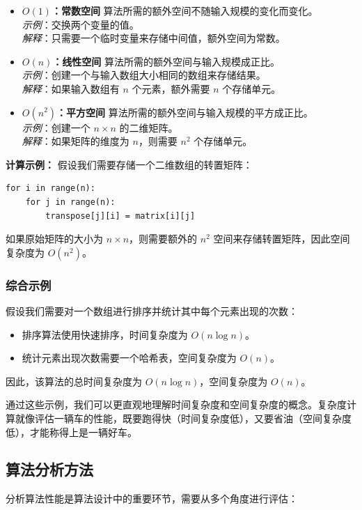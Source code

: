 \documentclass[lang=cn,newtx,10pt,scheme=chinese]{../elegantbook}
\begin{document}
\begin{itemize}
    \item \textbf{$O(1)$：常数空间}
    算法所需的额外空间不随输入规模的变化而变化。\\
    \textit{示例}：交换两个变量的值。\\
    \textit{解释}：只需要一个临时变量来存储中间值，额外空间为常数。

    \item \textbf{$O(n)$：线性空间}
    算法所需的额外空间与输入规模成正比。\\
    \textit{示例}：创建一个与输入数组大小相同的数组来存储结果。\\
    \textit{解释}：如果输入数组有 $n$ 个元素，额外需要 $n$ 个存储单元。

    \item \textbf{$O(n^2)$：平方空间}
    算法所需的额外空间与输入规模的平方成正比。\\
    \textit{示例}：创建一个 $n \times n$ 的二维矩阵。\\
    \textit{解释}：如果矩阵的维度为 $n$，则需要 $n^2$ 个存储单元。
\end{itemize}

\textbf{计算示例：}
假设我们需要存储一个二维数组的转置矩阵：
\begin{verbatim}
for i in range(n):
    for j in range(n):
        transpose[j][i] = matrix[i][j]
\end{verbatim}
如果原始矩阵的大小为 $n \times n$，则需要额外的 $n^2$ 空间来存储转置矩阵，因此空间复杂度为 $O(n^2)$。

\subsubsection{综合示例}
假设我们需要对一个数组进行排序并统计其中每个元素出现的次数：
\begin{itemize}
    \item 排序算法使用快速排序，时间复杂度为 $O(n \log n)$。
    \item 统计元素出现次数需要一个哈希表，空间复杂度为 $O(n)$。
\end{itemize}
因此，该算法的总时间复杂度为 $O(n \log n)$，空间复杂度为 $O(n)$。

通过这些示例，我们可以更直观地理解时间复杂度和空间复杂度的概念。复杂度计算就像评估一辆车的性能，既要跑得快（时间复杂度低），又要省油（空间复杂度低），才能称得上是一辆好车。

\subsection{算法分析方法}
分析算法性能是算法设计中的重要环节，需要从多个角度进行评估：
\end{document}
